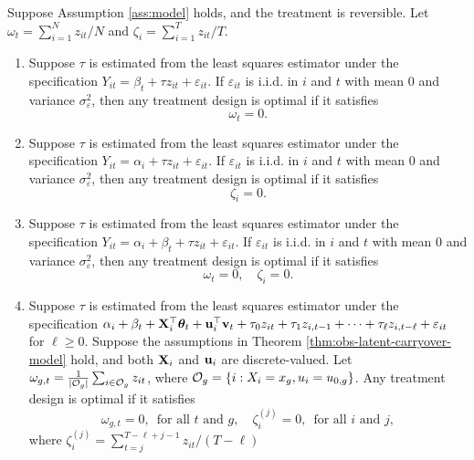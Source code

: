 \begin{proposition}\label{prop:rev-treat}
			Suppose Assumption \ref{ass:model} holds, and the treatment is reversible. Let $\omega_t =  \sum_{i = 1}^N z_{it}/N $ and $\zeta_i = \sum_{i = 1}^T z_{it} /T$.
			\begin{enumerate}
				\item Suppose $\tau$ is estimated from the least squares estimator under the specification $Y_{it} =\beta_t+ \tau z_{it} + \varepsilon_{it}$. If $\varepsilon_{it}$ is i.i.d. in $i$ and $t$ with mean $0$ and variance $\sigma_\varepsilon^2$, then any treatment design is optimal if it satisfies
				\[\omega_t = 0.\]
				\item Suppose $\tau$ is estimated from the least squares estimator under the specification $Y_{it} =\alpha_i+ \tau z_{it} + \varepsilon_{it}$. If $\varepsilon_{it}$ is i.i.d. in $i$ and $t$ with mean $0$ and variance $\sigma_\varepsilon^2$, then any treatment design is optimal if it satisfies
				\[\zeta_i = 0.\]
				\item Suppose $\tau$ is estimated from the least squares estimator under the specification $Y_{it} =\alpha_i+ \beta_t +\tau z_{it} + \varepsilon_{it}$. If $\varepsilon_{it}$ is i.i.d. in $i$ and $t$ with mean $0$ and variance $\sigma_\varepsilon^2$, then any treatment design is optimal if it satisfies
				\[\omega_t = 0, \quad \zeta_i = 0.\]
				\item Suppose $\tau$ is estimated from the least squares estimator under the specification $\alpha_i +  \beta_t +  \mathbf{X}^\top_i  \bm{\theta}_t+  \mathbf{u}^\top_i \mathbf{v}_t + \tau_0 z_{it} + \tau_1 z_{i,t-1} + \cdots + \tau_{\ell} z_{i,t-\ell} + \varepsilon_{it}$ for $\ell \geq 0$. Suppose the assumptions in  Theorem \ref{thm:obs-latent-carryover-model} hold, and both $\mathbf{X}_i$ and $\mathbf{u}_i$ are discrete-valued. Let $\omega_{g,t} = \frac{1}{|\mathcal{O}_g|} \sum_{i \in \mathcal{O}_g} z_{it}$, where $\mathcal{O}_g = \{i: X_i = x_g, u_i = u_{0,g}\}$. Any treatment design is optimal if it satisfies
				\[\omega_{g,t} = 0, \, \text{ for all $t$ and $g$}, \quad \zeta_i^{(j)} = 0, \, \text{ for all $i$ and $j$},\]
    where $\zeta_i^{(j)} = \sum_{t=j}^{T - \ell+j-1} z_{it} / (T - \ell)$
			\end{enumerate}
		\end{proposition}
		
